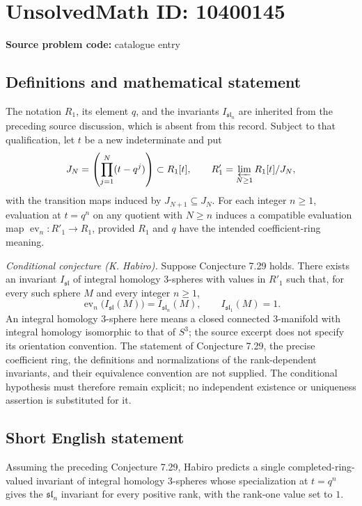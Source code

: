 \documentclass[11pt]{article}
\begin{document}
\section*{UnsolvedMath ID: 10400145}
\textbf{Source problem code:} catalogue entry
\subsection{Definitions and mathematical statement}
The notation \(R_1\), its element \(q\), and the invariants \(I_{\mathfrak{sl}_n}\) are inherited from the preceding source discussion, which is absent from this record. Subject to that qualification, let \(t\) be a new indeterminate and put
\[
 J_N=\left(\prod_{j=1}^{N}(t-q^j)\right)\subset R_1[t],\qquad
 R'_1=\varprojlim_{N\geq1}R_1[t]/J_N,
\]
with the transition maps induced by \(J_{N+1}\subseteq J_N\). For each integer \(n\geq1\), evaluation at \(t=q^n\) on any quotient with \(N\geq n\) induces a compatible evaluation map \(\operatorname{ev}_n:R'_1\to R_1\), provided \(R_1\) and \(q\) have the intended coefficient-ring meaning.

\emph{Conditional conjecture (K. Habiro).} Suppose Conjecture 7.29 holds. There exists an invariant \(I_{\mathfrak{sl}}\) of integral homology \(3\)-spheres with values in \(R'_1\) such that, for every such sphere \(M\) and every integer \(n\geq1\),
\[
 \operatorname{ev}_n\bigl(I_{\mathfrak{sl}}(M)\bigr)
 =I_{\mathfrak{sl}_n}(M),\qquad
 I_{\mathfrak{sl}_1}(M)=1.
\]
An integral homology \(3\)-sphere here means a closed connected \(3\)-manifold with integral homology isomorphic to that of \(S^3\); the source excerpt does not specify its orientation convention. The statement of Conjecture 7.29, the precise coefficient ring, the definitions and normalizations of the rank-dependent invariants, and their equivalence convention are not supplied. The conditional hypothesis must therefore remain explicit; no independent existence or uniqueness assertion is substituted for it.
\subsection{Short English statement}
Assuming the preceding Conjecture 7.29, Habiro predicts a single completed-ring-valued invariant of integral homology \(3\)-spheres whose specialization at \(t=q^n\) gives the \(\mathfrak{sl}_n\) invariant for every positive rank, with the rank-one value set to \(1\).
\end{document}
